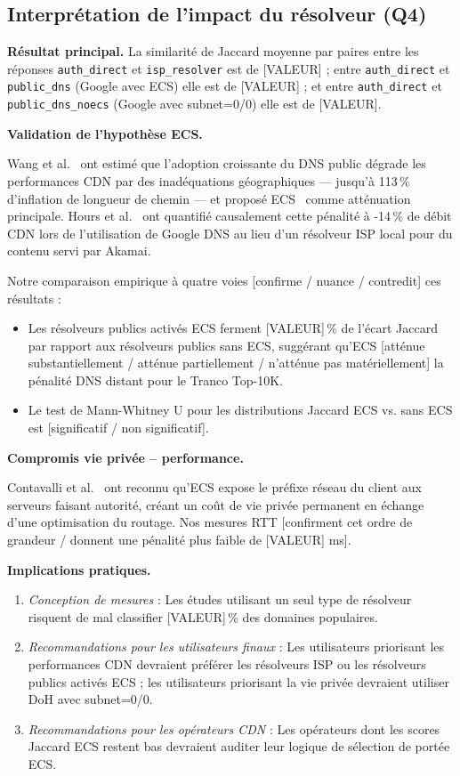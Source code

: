\subsection{Interprétation de l'impact du résolveur (Q4)}
\label{subsec:5.1.4}

\textbf{Résultat principal.} La similarité de Jaccard moyenne par paires entre les réponses \texttt{auth\_direct} et \texttt{isp\_resolver} est de [VALEUR] ; entre \texttt{auth\_direct} et \texttt{public\_dns} (Google avec ECS) elle est de [VALEUR] ; et entre \texttt{auth\_direct} et \texttt{public\_dns\_noecs} (Google avec subnet=0/0) elle est de [VALEUR].

\textbf{Validation de l'hypothèse ECS.}

Wang et al.~\cite{Wang2018} ont estimé que l'adoption croissante du DNS public dégrade les performances CDN par des inadéquations géographiques --- jusqu'à 113\,\% d'inflation de longueur de chemin --- et proposé ECS~\cite{RFC7871} comme atténuation principale. Hours et al.~\cite{Hours2016} ont quantifié causalement cette pénalité à -14\,\% de débit CDN lors de l'utilisation de Google DNS au lieu d'un résolveur ISP local pour du contenu servi par Akamai.

Notre comparaison empirique à quatre voies [confirme / nuance / contredit] ces résultats :
\begin{itemize}
  \item Les résolveurs publics activés ECS ferment [VALEUR]\,\% de l'écart Jaccard par rapport aux résolveurs publics sans ECS, suggérant qu'ECS [atténue substantiellement / atténue partiellement / n'atténue pas matériellement] la pénalité DNS distant pour le Tranco Top-10K.
  \item Le test de Mann-Whitney U pour les distributions Jaccard ECS vs. sans ECS est [significatif / non significatif].
\end{itemize}

\textbf{Compromis vie privée -- performance.}

Contavalli et al.~\cite{RFC7871} ont reconnu qu'ECS expose le préfixe réseau du client aux serveurs faisant autorité, créant un coût de vie privée permanent en échange d'une optimisation du routage. Nos mesures RTT [confirment cet ordre de grandeur / donnent une pénalité plus faible de [VALEUR] ms].

\textbf{Implications pratiques.}

\begin{enumerate}
  \item \textit{Conception de mesures} : Les études utilisant un seul type de résolveur risquent de mal classifier [VALEUR]\,\% des domaines populaires.
  \item \textit{Recommandations pour les utilisateurs finaux} : Les utilisateurs priorisant les performances CDN devraient préférer les résolveurs ISP ou les résolveurs publics activés ECS ; les utilisateurs priorisant la vie privée devraient utiliser DoH avec subnet=0/0.
  \item \textit{Recommandations pour les opérateurs CDN} : Les opérateurs dont les scores Jaccard ECS restent bas devraient auditer leur logique de sélection de portée ECS.
\end{enumerate}
\bigskip

